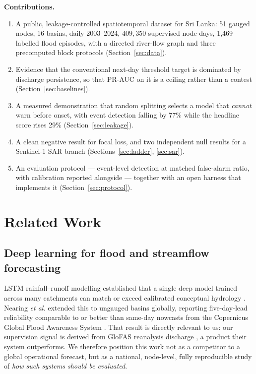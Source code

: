 \documentclass[conference]{IEEEtran}
\begin{document}
\textbf{Contributions.}
\begin{enumerate}
  \item A public, leakage-controlled spatiotemporal dataset for Sri Lanka: 51
        gauged nodes, 16 basins, daily 2003--2024, $409{,}350$ supervised
        node-days, 1{,}469 labelled flood episodes, with a directed river-flow
        graph and three precomputed block protocols (Section~\ref{sec:data}).
  \item Evidence that the conventional next-day threshold target is dominated by
        discharge persistence, so that PR-AUC on it is a ceiling rather than a
        contest (Section~\ref{sec:baselines}).
  \item A measured demonstration that random splitting selects a model that
        \emph{cannot} warn before onset, with event detection falling by 77\%
        while the headline score rises 29\% (Section~\ref{sec:leakage}).
  \item A clean negative result for focal loss, and two independent null results
        for a Sentinel-1 SAR branch (Sections~\ref{sec:ladder},
        \ref{sec:sar}).
  \item An evaluation protocol --- event-level detection at matched false-alarm
        ratio, with calibration reported alongside --- together with an open
        harness that implements it (Section~\ref{sec:protocol}).
\end{enumerate}

\section{Related Work}

\subsection{Deep learning for flood and streamflow forecasting}
LSTM rainfall--runoff modelling established that a single deep model trained
across many catchments can match or exceed calibrated conceptual hydrology
\cite{kratzert2018,kratzert2019}. Nearing \emph{et al.} extended this to
ungauged basins globally, reporting five-day-lead reliability comparable to or
better than same-day nowcasts from the Copernicus Global Flood Awareness System
\cite{nearing2024}. That result is directly relevant to us: our supervision
signal is derived from GloFAS reanalysis discharge \cite{harrigan2020}, a product
their system outperforms. We therefore position this work not as a competitor to
a global operational forecast, but as a national, node-level, fully reproducible
study of \emph{how such systems should be evaluated}.
\end{document}
